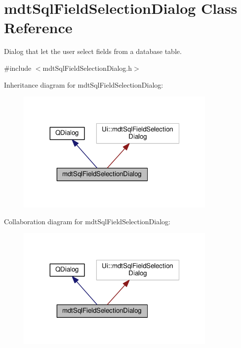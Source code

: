\hypertarget{classmdt_sql_field_selection_dialog}{\section{mdt\-Sql\-Field\-Selection\-Dialog Class Reference}
\label{classmdt_sql_field_selection_dialog}
}


Dialog that let the user select fields from a database table.  




{\ttfamily \#include $<$mdt\-Sql\-Field\-Selection\-Dialog.\-h$>$}



Inheritance diagram for mdt\-Sql\-Field\-Selection\-Dialog\-:\nopagebreak
\begin{figure}[H]
\begin{center}
\leavevmode
\includegraphics[width=275pt]{classmdt_sql_field_selection_dialog__inherit__graph}
\end{center}
\end{figure}


Collaboration diagram for mdt\-Sql\-Field\-Selection\-Dialog\-:\nopagebreak
\begin{figure}[H]
\begin{center}
\leavevmode
\includegraphics[width=275pt]{classmdt_sql_field_selection_dialog__coll__graph}
\end{center}
\end{figure}

